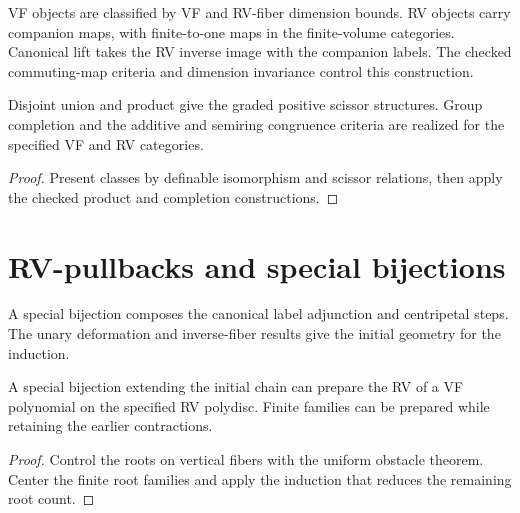 \begin{definition}
\label{def:lift-categories}
\leanok
VF objects are classified by VF and RV-fiber dimension bounds. RV
objects carry companion maps, with finite-to-one maps in the
finite-volume categories. Canonical lift takes the RV inverse image
with the companion labels. The checked commuting-map criteria and
dimension invariance control this construction.
\end{definition}

\begin{proposition}
\label{prop:grothendieck}
\leanok
Disjoint union and product give the graded positive scissor structures.
Group completion and the additive and semiring congruence criteria
are realized for the specified VF and RV categories.
\end{proposition}
\begin{proof}
\leanok
{}
Present classes by definable isomorphism and scissor relations, then
apply the checked product and completion constructions.
\end{proof}

\section{RV-pullbacks and special bijections}

\begin{definition}
\label{def:special-bijection}
\leanok
A special bijection composes the canonical label adjunction and
centripetal steps. The unary deformation and inverse-fiber results
give the initial geometry for the induction.
\end{definition}

\begin{theorem}
\label{thm:polynomial-preparation}
\leanok
A special bijection extending the initial chain can prepare the RV
of a VF polynomial on the specified RV polydisc. Finite families
can be prepared while retaining the earlier contractions.
\end{theorem}
\begin{proof}
\leanok
{}
Control the roots on vertical fibers with the uniform obstacle
theorem. Center the finite root families and apply the induction
that reduces the remaining root count.
\end{proof}

